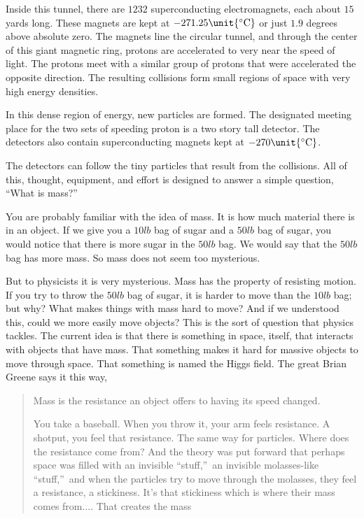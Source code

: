 \documentclass{article}
\begin{document}
Inside this tunnel, there are $1232$ superconducting electromagnets, each
about $15$ yards long. These magnets are kept at $-271.25\unit{%
{}^{\circ}{\rm C}%
}$ or just $1.9$ degrees above absolute zero. The magnets line the circular
tunnel, and through the center of this giant magnetic ring, protons are
accelerated to very near the speed of light. The protons meet with a similar
group of protons that were accelerated the opposite direction. The resulting
collisions form small regions of space with very high energy densities.

In this dense region of energy, new particles are formed. The designated
meeting place for the two sets of speeding proton is a two story tall
detector. The detectors also contain superconducting magnets kept at $-270%
\unit{%
{}^{\circ}{\rm C}%
}$. 

The detectors can follow the tiny particles that result from the collisions.
All of this, thought, equipment, and effort is designed to answer a simple
question, \textquotedblleft What is mass?\textquotedblright

You are probably familiar with the idea of mass. It is how much material
there is in an object. If we give you a $10lb$ bag of sugar and a $50lb$ bag
of sugar, you would notice that there is more sugar in the $50lb$ bag. We
would say that the $50lb$ bag has more mass. So mass does not seem too
mysterious.

But to physicists it is very mysterious. Mass has the property of resisting
motion. If you try to throw the $50lb$ bag of sugar, it is harder to move
than the $10lb$ bag; but why? What makes things with mass hard to move? And
if we understood this, could we more easily move objects? This is the sort
of question that physics tackles. The current idea is that there is
something in space, itself, that interacts with objects that have mass. That
something makes it hard for massive objects to move through space. That
something is named the Higgs field. The great Brian Greene says it this way,

\begin{quotation}
Mass is the resistance an object offers to having its speed changed.

You take a baseball. When you throw it, your arm feels resistance. A
shotput, you feel that resistance. The same way for particles. Where does
the resistance come from? And the theory was put forward that perhaps space
was filled with an invisible \textquotedblleft stuff,\textquotedblright\ an
invisible molasses-like \textquotedblleft stuff,\textquotedblright\ and when
the particles try to move through the molasses, they feel a resistance, a
stickiness. It's that stickiness which is where their mass comes from....
That creates the mass\cite{Green}
\end{quotation}
\end{document}
